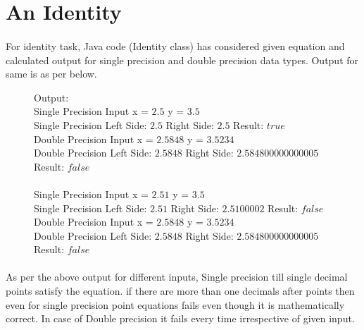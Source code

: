 \documentclass[12pt]{article}
\begin{document}
\section{An Identity}
\paragraph{}For identity task, Java code (Identity class) has considered given equation and calculated output for single precision and double precision data types. Output for same is as per below. \\

\begin{figure}[h]
	Output:\\
	Single Precision Input x = $2.5$  y = $3.5$ \\
	Single Precision Left Side: $2.5$  Right Side: $2.5$  Result: $true$ \\
	Double Precision Input x = $2.5848$  y = $3.5234$ \\
	Double Precision Left Side: $2.5848$  Right Side:  $2.584800000000005$  Result: $false$ \\ \\
	Single Precision Input x = $2.51$  y = $3.5$ \\
	Single Precision Left Side: $2.51$  Right Side: $2.5100002$  Result: $false$ 
	Double Precision Input x = $2.5848$  y = $3.5234$ \\
	Double Precision Left Side: $2.5848$  Right Side: $2.584800000000005$  Result: $false$
\end{figure}

\paragraph{} As per the above output for different inputs, Single precision till single decimal points satisfy the equation. if there are more than one decimals after points then even for single precision point equations fails even though it is mathematically correct. In case of Double precision it fails every time irrespective of given input.
\end{document}
